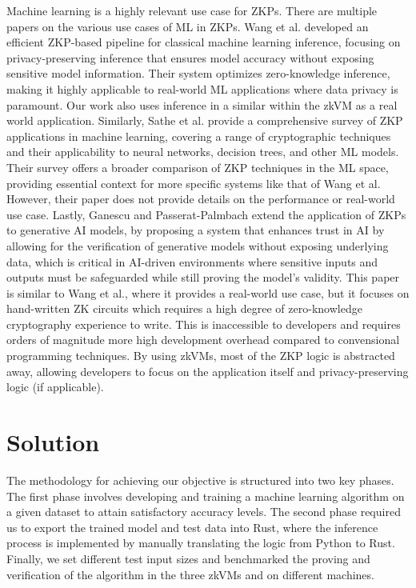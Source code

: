 \documentclass{scrartcl}
\begin{document}
Machine learning is a highly relevant use case for ZKPs. There are multiple papers on the various use cases of ML in ZKPs. Wang et al.\cite{wang2024efficient} developed an efficient ZKP-based pipeline for classical machine learning inference, focusing on privacy-preserving inference that ensures model accuracy without exposing sensitive model information. Their system optimizes zero-knowledge inference, making it highly applicable to real-world ML applications where data privacy is paramount. Our work also uses inference in a similar within the zkVM as a real world application. Similarly, Sathe et al.\cite{sathe2024survey} provide a comprehensive survey of ZKP applications in machine learning, covering a range of cryptographic techniques and their applicability to neural networks, decision trees, and other ML models. Their survey offers a broader comparison of ZKP techniques in the ML space, providing essential context for more specific systems like that of Wang et al. However, their paper does not provide details on the performance or real-world use case. Lastly, Ganescu and Passerat-Palmbach\cite{ganescu2024trust} extend the application of ZKPs to generative AI models, by proposing a system that enhances trust in AI by allowing for the verification of generative models without exposing underlying data, which is critical in AI-driven environments where sensitive inputs and outputs must be safeguarded while still proving the model’s validity. This paper is similar to Wang et al., where it provides a real-world use case, but it focuses on hand-written ZK circuits which requires a high degree of zero-knowledge cryptography experience to write. This is inaccessible to developers and requires orders of magnitude more high development overhead compared to convensional programming techniques. By using zkVMs, most of the ZKP logic is abstracted away, allowing developers to focus on the application itself and privacy-preserving logic (if applicable).

\section{Solution}

The methodology for achieving our objective is structured into two key phases. The first phase involves developing and training a machine learning algorithm on a given dataset to attain satisfactory accuracy levels. The second phase required us to export the trained model and test data into Rust, where the inference process is implemented by manually translating the logic from Python to Rust. Finally, we set different test input sizes and benchmarked the proving and verification of the algorithm in the three zkVMs and on different machines.
\end{document}
